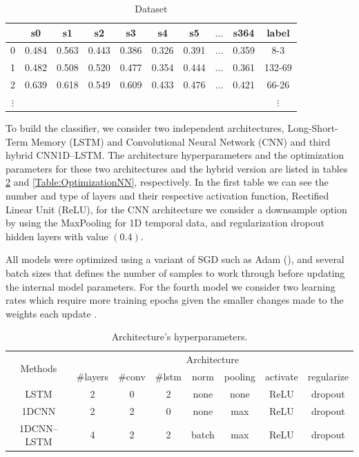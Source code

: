 \begin{table}[h]
	\centering
	\small
	\begin{tabular}[h]{|c|c|c|c|c|c|c|c|c|c|}
		\hline
		  & s0    & s1    & s2    & s3    & s4    &	s5    & $\ldots$ & s364  &   label \\ \hline
		0 & 0.484 & 0.563 & 0.443 & 0.386 & 0.326 &	0.391 & $\ldots$ & 0.359 &   8-3 \\
		1 &	0.482 &	0.508 &	0.520 &	0.477 &	0.354 &	0.444 & $\ldots$ & 0.361 & 132-69 \\
		2 &	0.639 & 0.618 &	0.549 &	0.609 &	0.433 & 0.476 & $\ldots$ & 0.421 &	66-26 \\ 
		$\vdots$  & &     &       &       &       &       &          &       & $\vdots$ \\ \hline
	\end{tabular}
	\caption{Dataset }
	\label{Table:DatasetTSC}
\end{table}

To build the classifier, we consider two independent architectures, Long-Short-Term Memory (LSTM) and Convolutional Neural Network (CNN) and third hybrid CNN1D--LSTM. The architecture hyperparameters and the optimization parameters for these two architectures and the hybrid version are listed in tables \ref{Table:HyperparametersNN} and \ref{Table:OptimizationNN}, respectively. In the first table we can see the number and type of layers and their respective activation function, Rectified Linear Unit (ReLU), for the CNN architecture we consider a downsample option by using the MaxPooling for 1D temporal data, and regularization dropout hidden layers with value $(0.4)$.

All models were optimized using a variant of SGD such as Adam (\cite{Kingma2015}), and several batch sizes that defines the number of samples to work through before updating the internal model parameters. For the fourth model we consider two learning rates which require more training epochs given the smaller changes made to the weights each update \cite{Patterson2017}.

\begin{table}[h]
	\centering
	\tiny
	\begin{tabular}{|c|c|c|c|c|c|c|c|}
		\hline
		\multirow{2}{*}{Methods} & \multicolumn{7}{c|}{Architecture} \\
		\cline{2-8}
		& \#layers & \#conv & \#lstm & norm & pooling & activate & regularize \\
		\cline{2-8}
		\hline
		LSTM & 2 & 0 & 2 & none & none & ReLU & dropout \\
		\hline
		1DCNN & 2 & 2 & 0 & none & max & ReLU & dropout \\
		\hline
		1DCNN--LSTM & 4 & 2 & 2 & batch & max & ReLU & dropout  \\
		\hline
	\end{tabular}
	\caption{Architecture’s hyperparameters.}
	\label{Table:HyperparametersNN}
\end{table}

